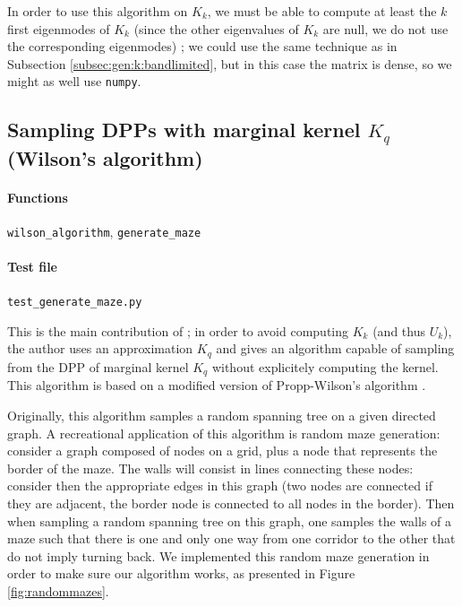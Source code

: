 \documentclass{article}
\begin{document}
In order to use this algorithm on $K_k$, we must be able to compute at least the $k$ first eigenmodes of $K_k$ (since the other eigenvalues of $K_k$ are null, we do not use the corresponding eigenmodes) ; we could use the same technique as in Subsection \ref{subsec:gen:k:bandlimited}, but in this case the matrix is dense, so we might as well use \verb#numpy#.%


\subsection[Sampling DPPs with marginal kernel Kq (Wilson's algorithm)]{Sampling DPPs with marginal kernel $K_q$ (Wilson's algorithm)} \label{subs:sampling:wilson}


\paragraph{Functions} \verb#wilson_algorithm#, \verb#generate_maze#
\paragraph{Test file} \verb#test_generate_maze.py#


This is the main contribution of \cite{tremblay2017} ; in order to avoid computing $K_k$ (and thus $U_k$), the author uses an approximation $K_q$ and gives an algorithm capable of sampling from the DPP of marginal kernel $K_q$ without explicitely computing the kernel. This algorithm is based on a modified version of Propp-Wilson's algorithm \cite{propp1998}. 


Originally, this algorithm samples a random spanning tree on a given directed graph. A recreational application of this algorithm is random maze generation: consider a graph composed of nodes on a grid, plus a node that represents the border of the maze. The walls will consist in lines connecting these nodes: consider then the appropriate edges in this graph (two nodes are connected if they are adjacent, the border node is connected to all nodes in the border). Then when sampling a random spanning tree on this graph, one samples the walls of a maze such that there is one and only one way from one corridor to the other that do not imply turning back. We implemented this random maze generation in order to make sure our algorithm works, as presented in Figure \ref{fig:randommazes}.
\end{document}
